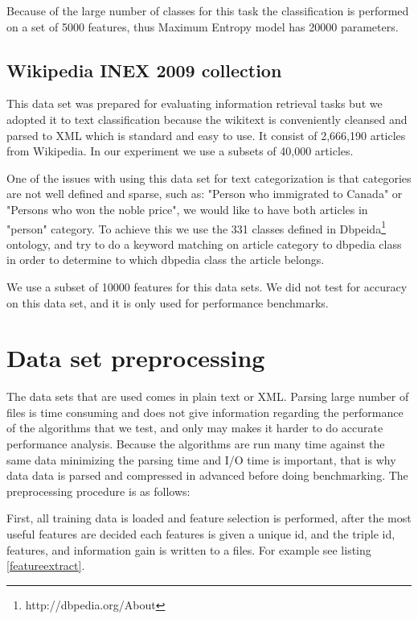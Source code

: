 \documentclass{report}
\begin{document}
Because of the large number of classes for this task the classification is performed on a set of 5000 features, thus Maximum Entropy model has 20000 parameters.

\subsection{Wikipedia INEX 2009 collection}

This data set was prepared for evaluating information retrieval tasks but we adopted it to text classification because the wikitext is conveniently cleansed  and parsed to XML which is standard and easy to use. It consist of 2,666,190 articles from Wikipedia. In our experiment we use a subsets of 40,000 articles.

One of the issues with using this data set for text categorization is that categories are not well defined and sparse, such as: "Person who immigrated to Canada" or "Persons who won the noble price", we would like to have both articles in "person" category. To achieve this we use the 331 classes defined in Dbpeida\footnote{http://dbpedia.org/About} ontology, and try to do a keyword matching on article category to dbpedia class in order to determine to which dbpedia class the article belongs.

We use a subset of 10000 features for this data sets. We did not test for accuracy on this data set, and it is only used for performance benchmarks.

\section{Data set preprocessing}

The data sets that are used comes in plain text or XML. Parsing large number of files is time consuming and does not give information regarding the performance of the algorithms that we test, and only may makes it harder to do accurate performance analysis. Because the algorithms are run many time against the same data minimizing the parsing time and I/O time is important,  that is why data data is parsed and compressed in advanced before doing benchmarking. The preprocessing procedure is as follows:

First, all training data is loaded and feature selection is performed, after the most useful features are decided each features is given a unique id, and the triple id, features, and information gain is written to a files. For example see listing \ref{featureextract}.
\end{document}
